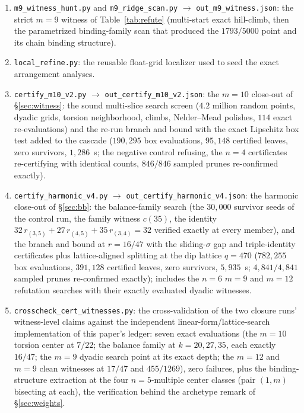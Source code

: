 \begin{enumerate}[leftmargin=1.6em,itemsep=2pt]
{the survivor boxes), the center-plus-slack Lipschitz net over the
survivors, and the exact arrangement analysis of the surviving regions
(\S\ref{sec:bb}, Table~\ref{tab:certs}).\par}
\item \texttt{m9\_witness\_hunt.py} and \texttt{m9\_ridge\_scan.py} $\to$
\texttt{out\_m9\_witness.json}: the strict $m=9$ witness of
Table~\ref{tab:refute} (multi-start exact hill-climb, then the
parametrized binding-family scan that produced the $1793/5000$ point
and its chain binding structure).
\item \texttt{local\_refine.py}: the reusable float-grid localizer used
to seed the exact arrangement analyses.
\item \texttt{certify\_m10\_v2.py} $\to$ \texttt{out\_certify\_m10\_v2.json}:
the $m=10$ close-out of \S\ref{sec:witness}: the sound multi-slice
search screen ($4.2$ million random points, dyadic grids, torsion
neighborhood, climbs, Nelder--Mead polishes, $114$ exact
re-evaluations) and the re-run branch and bound with the exact
Lipschitz box test added to the cascade ($190{,}295$ box evaluations,
$95{,}148$ certified leaves, zero survivors, $1{,}286$~s; the negative
control refusing, the $n=4$ certificates re-certifying with identical
counts, $846/846$ sampled prunes re-confirmed exactly).
\item \texttt{certify\_harmonic\_v4.py} $\to$
\texttt{out\_certify\_harmonic\_v4.json}: the harmonic close-out of
\S\ref{sec:bb}: the balance-family search (the $30{,}000$ survivor
seeds of the control run, the family witness $c(35)$, the identity
$32\,r_{(3,5)}+27\,r_{(4,5)}+35\,r_{(3,4)}=32$ verified exactly at
every member), and the branch and bound at $r=16/47$ with the
sliding-$\sigma$ gap and triple-identity certificates plus
lattice-aligned splitting at the dip lattice $q=470$ ($782{,}255$ box
evaluations, $391{,}128$ certified leaves, zero survivors, $5{,}935$~s;
$4{,}841/4{,}841$ sampled prunes re-confirmed exactly); includes the
$n=6$ $m=9$ and $m=12$ refutation searches with their exactly evaluated
dyadic witnesses.
\item \texttt{crosscheck\_cert\_witnesses.py}: the cross-validation of
the two closure runs' witness-level claims against the independent
linear-form/lattice-search implementation of this paper's ledger:
seven exact evaluations (the $m=10$ torsion center at $7/22$; the
balance family at $k=20,27,35$, each exactly $16/47$; the $m=9$ dyadic
search point at its exact depth; the $m=12$ and $m=9$ clean witnesses
at $17/47$ and $455/1269$), zero failures, plus the binding-structure
extraction at the four $n=5$-multiple center classes (pair $(1,m)$
bisecting at each), the verification behind the archetype remark of
\S\ref{sec:weights}.
\end{enumerate}

